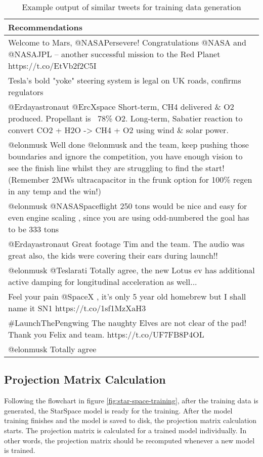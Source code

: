 \begin{table}[!htb]
    \centering
    \caption{Example output of similar tweets for training data generation}
    \label{tab:example-train-data}
    \begin{tabular}{|m{}|}
        \hline
        \textbf{Recommendations} \\
        \hline
        Welcome to Mars, @NASAPersevere! Congratulations @NASA and @NASAJPL – another successful mission to the Red Planet https://t.co/EtVb2f2C5I \\
        \hline
        Tesla’s bold "yoke" steering system is legal on UK roads, confirms regulators \\
        \hline
        @Erdayastronaut @ErcXspace Short-term, CH4 delivered \& O2 produced. Propellant is ~78\% O2. Long-term, Sabatier reaction to convert CO2 + H2O -> CH4 + O2 using wind \& solar power. \\
        \hline
        @elonmusk Well done @elonmusk and the team, keep pushing those boundaries and ignore the competition,  you have enough vision to see the finish line whilst they are struggling to find the start! (Remember 2MWs ultracapacitor in the frunk option for 100\% regen in any temp and the win!) \\
        \hline
        @elonmusk @NASASpaceflight 250 tons would be nice and easy for even engine scaling , since you are using odd-numbered the goal has to be 333 tons \\
        \hline
        @Erdayastronaut Great footage Tim and the team. The audio was great also,  the kids were covering their ears during launch!! \\
        \hline
        @elonmusk @Teslarati Totally agree, the new Lotus ev has additional active damping for longitudinal acceleration as well... \\
        \hline
        Feel your pain @SpaceX , it's only 5 year old homebrew but I shall name it SN1 https://t.co/1sf1MzXaH3 \\
        \hline
        \#LaunchThePengwing The naughty Elves are not clear of the pad! Thank you Felix and team. https://t.co/UF7FB8P4OL \\
        \hline
        @elonmusk Totally agree \\
        \hline
    \end{tabular}
\end{table}


\subsection{Projection Matrix Calculation}
\label{subsec:projection-matrix-calculation}
Following the flowchart in figure \ref{fig:star-space-training}, after the training data is generated, the StarSpace model is ready for the training. After the model training finishes and the model is saved to disk, the projection matrix calculation starts. The projection matrix is calculated for a trained model individually. In other words, the projection matrix should be recomputed whenever a new model is trained.


